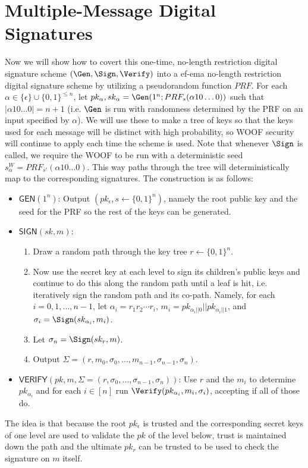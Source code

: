 \section{Multiple-Message Digital Signatures} 

Now we will show how to covert this one-time, no-length restriction digital signature scheme $(\Gen, \Sign, \Verify)$ into a ef-ema no-length restriction digital signature scheme by utilizing a pseudorandom function $PRF$. 
For each $\alpha \in \{\epsilon\} \cup \{0,1\}^{\leq n}$, let $pk_\alpha, sk_\alpha = \Gen(1^n; PRF_s(\alpha 10 \ldots 0))$ such that $|\alpha 10 \ldots 0| = n+1$ (i.e. $\Gen$ is run with randomness determined by the PRF on an input specified by $\alpha$). 
We will use these to make a tree of keys so that the keys used for each message will be distinct with high probability, so WOOF security will continue to apply each time the scheme is used. 
Note that whenever $\Sign$ is called, we require the WOOF to be run with a deterministic seed $s_{\alpha}^W = PRF_{s'}(\alpha 10 \ldots 0)$. 
This way paths through the tree will deterministically map to the corresponding signatures. 
The construction is as follows: 
\begin{itemize}
    \item $\mathsf{GEN}(1^n)$: Output $(pk_\epsilon, s \leftarrow \{0,1\}^n)$, namely the root public key and the seed for the PRF so the rest of the keys can be generated. 

    \item $\mathsf{SIGN}(sk, m)$: 
    \begin{enumerate}
        \item Draw a random path through the key tree $r \leftarrow \{0,1\}^n$. 

        \item Now use the secret key at each level to sign its children's public keys and continue to do this along the random path until a leaf is hit, i.e. iteratively sign the random path and its co-path. 
        Namely, for each $i = 0, 1, \ldots, n-1$, let $\alpha_i = r_1 r_2 \cdots r_i$, $m_i = pk_{\alpha_i || 0} || pk_{\alpha_i || 1}$, and $\sigma_i = \Sign(sk_{\alpha_i}, m_i)$. 

        \item Let $\sigma_n = \Sign(sk_r, m)$. 

        \item Output $\Sigma = (r, m_0, \sigma_0, \ldots, m_{n-1}, \sigma_{n-1}, \sigma_n)$. 
    \end{enumerate} 

    \item $\mathsf{VERIFY}(pk, m, \Sigma = (r, \sigma_0, \ldots, \sigma_{n-1}, \sigma_n))$: Use $r$ and the $m_i$ to determine $pk_{\alpha_i}$ and for each $i \in [n]$ run $\Verify(pk_{\alpha_i}, m_i, \sigma_i)$, accepting if all of those do. 
\end{itemize}
The idea is that because the root $pk_{\epsilon}$ is trusted and the corresponding secret keys of one level are used to validate the $pk$ of the level below, trust is maintained down the path and the ultimate $pk_r$ can be trusted to be used to check the signature on $m$ itself. 

